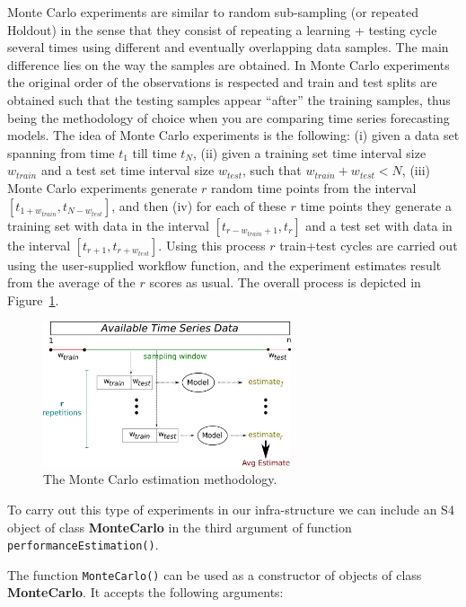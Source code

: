 \documentclass[10pt,a4paper]{article}\usepackage[]{graphicx}\usepackage[]{color}
\begin{document}
Monte Carlo experiments are similar to random sub-sampling (or repeated
Holdout) in the sense that they consist of repeating a learning +
testing cycle several times using different and eventually overlapping data samples. The main
difference lies on the way the samples are obtained. In Monte Carlo
experiments the original order of the observations is respected and
train and test splits are obtained such that the testing samples
appear ``after'' the training samples, thus being the methodology of
choice when you are comparing time series forecasting models. The idea
of Monte Carlo experiments is the following: (i) given a data set
spanning from time $t_1$ till time $t_N$, (ii) given a training set
time interval size $w_{train}$ and a test set time interval size $w_{test}$, such
that $w_{train}+w_{test} < N$, (iii) Monte Carlo experiments generate $r$ random time
points from the interval $[t_{1+w_{train}},t_{N-w_{test}}]$, and then (iv) for each
of these $r$ time points they generate a training set with data in the
interval $[t_{r-w_{train}+1},t_{r}]$ and a test set with data in the interval
$[t_{r+1},t_{r+w_{test}}]$. Using this process $r$ train+test cycles are
carried out using the user-supplied workflow function, and the
experiment estimates result from the average of the $r$ scores as
usual. The overall process is depicted in Figure~\ref{fig:MC}.

\begin{figure}[ht]
  \centering
  \includegraphics[width=0.65\textwidth]{figures/MCestimates.png}
  \caption{The Monte Carlo estimation methodology.}
  \label{fig:MC}
\end{figure}

To carry out this type of experiments in our infra-structure we can
include an S4 object of class \textbf{MonteCarlo} in the third
argument of function \texttt{performanceEstimation()}.

The function \texttt{MonteCarlo()} can be used as a constructor of
objects of class \textbf{MonteCarlo}. It accepts the following
arguments:
\end{document}

